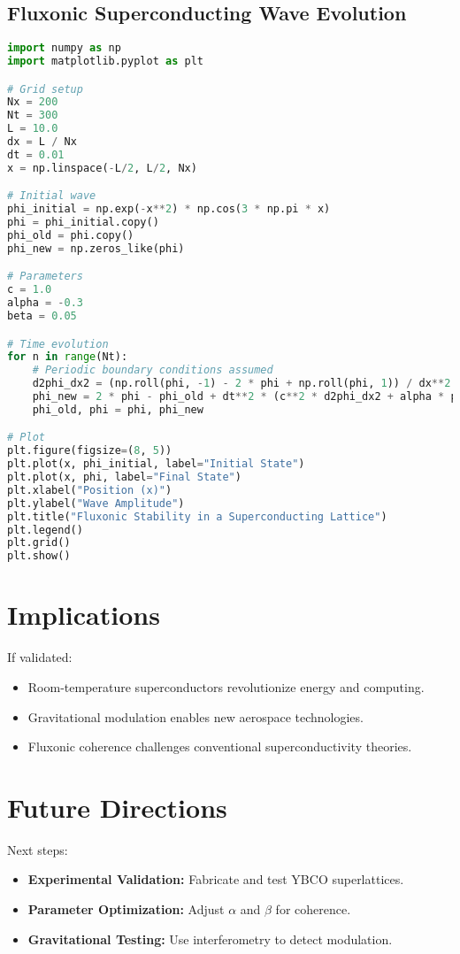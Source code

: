 \documentclass{article}
\begin{document}
\subsection{Fluxonic Superconducting Wave Evolution}
\begin{lstlisting}[language=Python, caption=Fluxonic Superconducting Wave Evolution, label=lst:superconductor]
import numpy as np
import matplotlib.pyplot as plt

# Grid setup
Nx = 200
Nt = 300
L = 10.0
dx = L / Nx
dt = 0.01
x = np.linspace(-L/2, L/2, Nx)

# Initial wave
phi_initial = np.exp(-x**2) * np.cos(3 * np.pi * x)
phi = phi_initial.copy()
phi_old = phi.copy()
phi_new = np.zeros_like(phi)

# Parameters
c = 1.0
alpha = -0.3
beta = 0.05

# Time evolution
for n in range(Nt):
    # Periodic boundary conditions assumed
    d2phi_dx2 = (np.roll(phi, -1) - 2 * phi + np.roll(phi, 1)) / dx**2
    phi_new = 2 * phi - phi_old + dt**2 * (c**2 * d2phi_dx2 + alpha * phi + beta * phi**3)
    phi_old, phi = phi, phi_new

# Plot
plt.figure(figsize=(8, 5))
plt.plot(x, phi_initial, label="Initial State")
plt.plot(x, phi, label="Final State")
plt.xlabel("Position (x)")
plt.ylabel("Wave Amplitude")
plt.title("Fluxonic Stability in a Superconducting Lattice")
plt.legend()
plt.grid()
plt.show()
\end{lstlisting}

\section{Implications}
If validated:
\begin{itemize}
    \item Room-temperature superconductors revolutionize energy and computing.
    \item Gravitational modulation enables new aerospace technologies.
    \item Fluxonic coherence challenges conventional superconductivity theories.
\end{itemize}

\section{Future Directions}
Next steps:
\begin{itemize}
    \item \textbf{Experimental Validation:} Fabricate and test YBCO superlattices.
    \item \textbf{Parameter Optimization:} Adjust \(\alpha\) and \(\beta\) for coherence.
    \item \textbf{Gravitational Testing:} Use interferometry to detect modulation.
\end{itemize}
\end{document}
